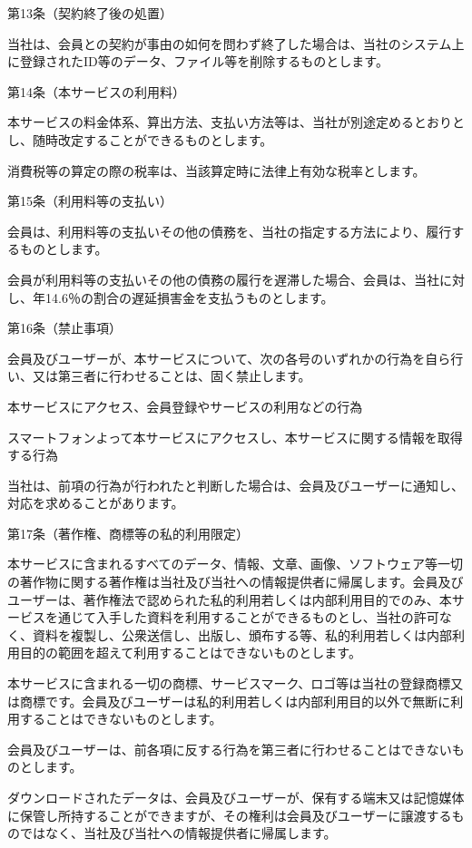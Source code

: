 第13条（契約終了後の処置）

    当社は、会員との契約が事由の如何を問わず終了した場合は、当社のシステム上に登録されたID等のデータ、ファイル等を削除するものとします。

第14条（本サービスの利用料）

    本サービスの料金体系、算出方法、支払い方法等は、当社が別途定めるとおりとし、随時改定することができるものとします。

    消費税等の算定の際の税率は、当該算定時に法律上有効な税率とします。

第15条（利用料等の支払い）

    会員は、利用料等の支払いその他の債務を、当社の指定する方法により、履行するものとします。

    会員が利用料等の支払いその他の債務の履行を遅滞した場合、会員は、当社に対し、年14.6％の割合の遅延損害金を支払うものとします。

第16条（禁止事項）

    会員及びユーザーが、本サービスについて、次の各号のいずれかの行為を自ら行い、又は第三者に行わせることは、固く禁止します。

        本サービスにアクセス、会員登録やサービスの利用などの行為

        スマートフォンよって本サービスにアクセスし、本サービスに関する情報を取得する行為

    当社は、前項の行為が行われたと判断した場合は、会員及びユーザーに通知し、対応を求めることがあります。

第17条（著作権、商標等の私的利用限定）

    本サービスに含まれるすべてのデータ、情報、文章、画像、ソフトウェア等一切の著作物に関する著作権は当社及び当社への情報提供者に帰属します。会員及びユーザーは、著作権法で認められた私的利用若しくは内部利用目的でのみ、本サービスを通じて入手した資料を利用することができるものとし、当社の許可なく、資料を複製し、公衆送信し、出版し、頒布する等、私的利用若しくは内部利用目的の範囲を超えて利用することはできないものとします。

    本サービスに含まれる一切の商標、サービスマーク、ロゴ等は当社の登録商標又は商標です。会員及びユーザーは私的利用若しくは内部利用目的以外で無断に利用することはできないものとします。

    会員及びユーザーは、前各項に反する行為を第三者に行わせることはできないものとします。

    ダウンロードされたデータは、会員及びユーザーが、保有する端末又は記憶媒体に保管し所持することができますが、その権利は会員及びユーザーに譲渡するものではなく、当社及び当社への情報提供者に帰属します。

